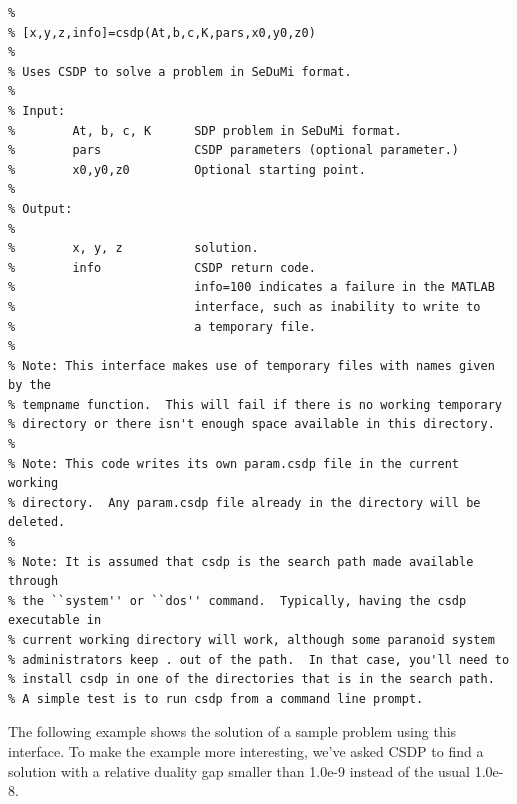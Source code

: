 \documentclass{article}
\begin{document}
\begin{verbatim}
%
% [x,y,z,info]=csdp(At,b,c,K,pars,x0,y0,z0)
%
% Uses CSDP to solve a problem in SeDuMi format.
%
% Input:
%        At, b, c, K      SDP problem in SeDuMi format.
%        pars             CSDP parameters (optional parameter.)
%        x0,y0,z0         Optional starting point.
%
% Output:
%
%        x, y, z          solution.
%        info             CSDP return code.
%                         info=100 indicates a failure in the MATLAB
%                         interface, such as inability to write to 
%                         a temporary file.
%
% Note: This interface makes use of temporary files with names given by the
% tempname function.  This will fail if there is no working temporary
% directory or there isn't enough space available in this directory.  
%
% Note: This code writes its own param.csdp file in the current working
% directory.  Any param.csdp file already in the directory will be deleted.
%
% Note: It is assumed that csdp is the search path made available through
% the ``system'' or ``dos'' command.  Typically, having the csdp executable in
% current working directory will work, although some paranoid system
% administrators keep . out of the path.  In that case, you'll need to
% install csdp in one of the directories that is in the search path.
% A simple test is to run csdp from a command line prompt. 
\end{verbatim}   

The following example shows the solution of a sample problem using this
interface.  To make the example more interesting, we've asked CSDP to 
find a solution with a relative duality gap smaller than 1.0e-9 instead
of the usual 1.0e-8.  
\end{document}
